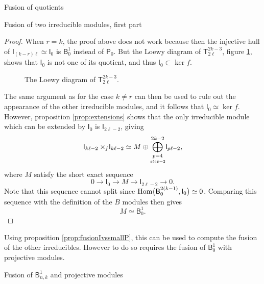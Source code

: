 \documentclass[reqno]{amsart}
\newcommand{\dl}[1]{\mathsf I_{#1}}
\newcommand{\dP}[1]{\mathsf P_{#1}}
\newcommand{\xf}{\times\hspace{-0.27em}_f}
\newcommand{\T}[2]{\mathsf{T}^{#1}_{#2}}
\newcommand{\B}[2]{\mathsf{B}^{#1}_{#2}}
\newcommand{\lc}{\ell}
\newcommand{\Hom}[1]{\text{\rm{Hom}}\big( #1 \big)}
\begin{document}
\begin{section}{Fusion of quotients}
\begin{subsection}{Fusion of two irreducible modules, first part}
\begin{proof}
When $r=k$, the proof above does not work because then the injective hull of $\dl{(k-r)\lc}\simeq\dl{0}$ is $\B{1}{0} $ instead of $\dP{0}$. But the Loewy diagram of  $\T{2k-3}{2 \lc}$, figure \ref{fig:LdiagT2lc}, shows that $\dl{0}$ is not one of its quotient, and thus $\dl{0} \subset \ker f$.
\begin{figure}[h!]
\caption{The Loewy diagram of $\T{2k-3}{2 \lc}$.}\label{fig:LdiagT2lc}
\end{figure}
 The same argument as for the case $k\neq r$ can then be used to rule out the appearance of the other irreducible modules, and it follows that $\dl{0} \simeq \ker f$. However, proposition \ref{prop:extensions} shows that the only irreducible module which can be extended by $\dl{0}$ is $\dl{2\lc -2}$, giving
\begin{equation}
\dl{k \lc -2} \xf \dl{k \lc -2} \simeq M \oplus \overset{2k-2}{\underset{\underset{step=2}{p=4}}{\bigoplus}}\dl{p \lc -2},
\end{equation}
where $M$ satisfy the short exact sequence
\begin{equation*}
0 \longrightarrow \dl{0} \longrightarrow M \longrightarrow \dl{2 \lc -2} \longrightarrow 0.
\end{equation*}
Note that this sequence cannot split since $\Hom{\B{2(k-1)}{0},\dl{0}} \simeq 0$. Comparing this sequence with the definition of the $B$ modules then gives $$M \simeq \B{1}{0}.$$
\end{proof}
Using proposition \ref{prop:fusionIvssmallP}, this can be used to compute the fusion of the other irreducibles. However to do so requires the fusion of $\B{1}{0}$ with projective modules.
\end{subsection}
\begin{subsection}{Fusion of $\B{1}{n,k}$ and projective modules}

\end{subsection}
\end{section}
\end{document}

